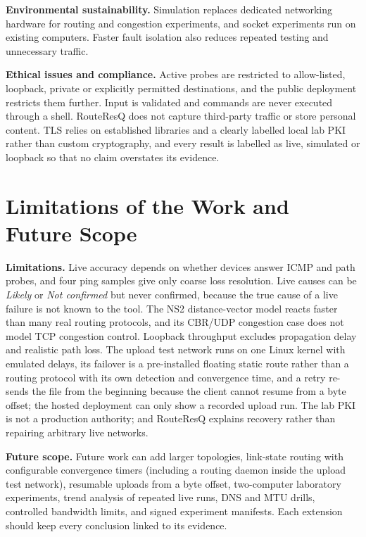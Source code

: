 \documentclass[12pt,a4paper]{report}
\numberwithin{equation}{chapter}
\begin{document}
\noindent\textbf{Environmental sustainability.} Simulation replaces dedicated networking hardware for routing and congestion experiments, and socket experiments run on existing computers. Faster fault isolation also reduces repeated testing and unnecessary traffic.

\noindent\textbf{Ethical issues and compliance.} Active probes are restricted to allow-listed, loopback, private or explicitly permitted destinations, and the public deployment restricts them further. Input is validated and commands are never executed through a shell. RouteResQ does not capture third-party traffic or store personal content. TLS relies on established libraries and a clearly labelled local lab PKI rather than custom cryptography, and every result is labelled as live, simulated or loopback so that no claim overstates its evidence.
\section{Limitations of the Work and Future Scope}
\noindent\textbf{Limitations.} Live accuracy depends on whether devices answer ICMP and path probes, and four ping samples give only coarse loss resolution. Live causes can be \emph{Likely} or \emph{Not confirmed} but never confirmed, because the true cause of a live failure is not known to the tool. The NS2 distance-vector model reacts faster than many real routing protocols, and its CBR/UDP congestion case does not model TCP congestion control. Loopback throughput excludes propagation delay and realistic path loss. The upload test network runs on one Linux kernel with emulated delays, its failover is a pre-installed floating static route rather than a routing protocol with its own detection and convergence time, and a retry re-sends the file from the beginning because the client cannot resume from a byte offset; the hosted deployment can only show a recorded upload run. The lab PKI is not a production authority; and RouteResQ explains recovery rather than repairing arbitrary live networks.

\noindent\textbf{Future scope.} Future work can add larger topologies, link-state routing with configurable convergence timers (including a routing daemon inside the upload test network), resumable uploads from a byte offset, two-computer laboratory experiments, trend analysis of repeated live runs, DNS and MTU drills, controlled bandwidth limits, and signed experiment manifests. Each extension should keep every conclusion linked to its evidence.
\end{document}
